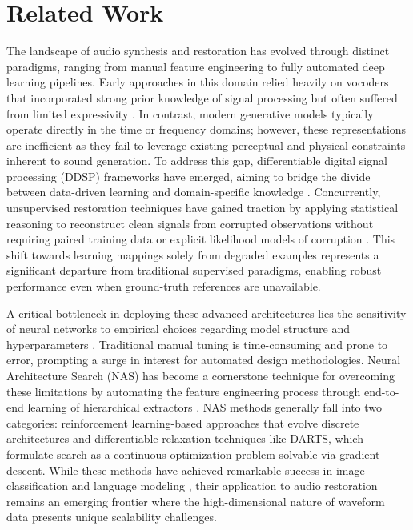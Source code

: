 \section{Related Work}

The landscape of audio synthesis and restoration has evolved through distinct paradigms, ranging from manual feature engineering to fully automated deep learning pipelines. Early approaches in this domain relied heavily on vocoders that incorporated strong prior knowledge of signal processing but often suffered from limited expressivity \citep{engel2020ddsp}. In contrast, modern generative models typically operate directly in the time or frequency domains; however, these representations are inefficient as they fail to leverage existing perceptual and physical constraints inherent to sound generation. To address this gap, differentiable digital signal processing (DDSP) frameworks have emerged, aiming to bridge the divide between data-driven learning and domain-specific knowledge \citep{engel2020ddsp}. Concurrently, unsupervised restoration techniques have gained traction by applying statistical reasoning to reconstruct clean signals from corrupted observations without requiring paired training data or explicit likelihood models of corruption \citep{lehtinen2018n2n}. This shift towards learning mappings solely from degraded examples represents a significant departure from traditional supervised paradigms, enabling robust performance even when ground-truth references are unavailable.

A critical bottleneck in deploying these advanced architectures lies the sensitivity of neural networks to empirical choices regarding model structure and hyperparameters \citep{jaderberg2017pbt}. Traditional manual tuning is time-consuming and prone to error, prompting a surge in interest for automated design methodologies. Neural Architecture Search (NAS) has become a cornerstone technique for overcoming these limitations by automating the feature engineering process through end-to-end learning of hierarchical extractors \citep{elsken2019nas}. NAS methods generally fall into two categories: reinforcement learning-based approaches that evolve discrete architectures and differentiable relaxation techniques like DARTS, which formulate search as a continuous optimization problem solvable via gradient descent. While these methods have achieved remarkable success in image classification and language modeling \citep{liu2019darts}, their application to audio restoration remains an emerging frontier where the high-dimensional nature of waveform data presents unique scalability challenges.


